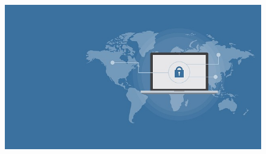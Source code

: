 \begin{figure}[h]

    \includegraphics[width=\textwidth]{figures/example.jpg}
    \label{fig:example}
\end{figure}

